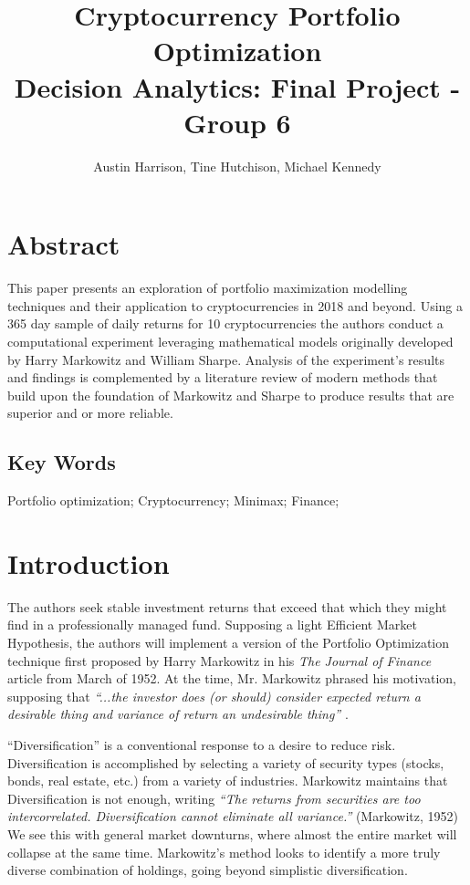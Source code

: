 \documentclass[11pt]{article} %
\title{Cryptocurrency Portfolio Optimization\\
\large Decision Analytics:  Final Project - Group 6}
\author{Austin Harrison, Tine Hutchison, Michael Kennedy}
\begin{document}
\maketitle


\section{Abstract}

This paper presents an exploration of portfolio maximization modelling techniques and their application to cryptocurrencies in 2018 and beyond.  Using a 365 day sample of daily returns for 10 cryptocurrencies the authors conduct a computational experiment leveraging mathematical models originally developed by Harry Markowitz and William Sharpe.  Analysis of the experiment’s results and findings is complemented by a literature review of modern methods that build upon the foundation of Markowitz and Sharpe to produce results that are superior and or more reliable.

\subsection{Key Words}

Portfolio optimization; Cryptocurrency; Minimax; Finance;

\section{Introduction}

The authors seek stable investment returns that exceed that which they might find in a professionally managed fund. Supposing a light Efficient Market Hypothesis, the authors will implement a version of the Portfolio Optimization technique first proposed by Harry Markowitz in his\emph{ The Journal of Finance} article from March of 1952. At the time, Mr. Markowitz phrased his motivation, supposing that\emph{ ``...the investor does (or should) consider expected return a desirable thing and variance of return an undesirable thing”} \cite{markowitz}.

``Diversification” is a conventional response to a desire to reduce risk. Diversification is accomplished by selecting a variety of security types (stocks, bonds, real estate, etc.) from a variety of industries. Markowitz maintains that Diversification is not enough, writing \emph{``The returns from securities are too intercorrelated. Diversification cannot eliminate all variance.”} (Markowitz, 1952) We see this with general market downturns, where almost the entire market will collapse at the same time. Markowitz’s method looks to identify a more truly diverse combination of holdings, going beyond simplistic diversification.
\end{document}
